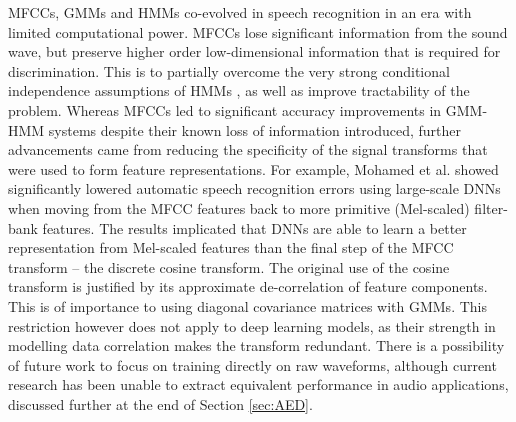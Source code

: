 \documentclass[12pt]{llncs}
\begin{document}
 MFCCs, GMMs and HMMs co-evolved in speech recognition in an era with limited computational power. MFCCs lose significant information from the sound wave, but preserve higher order low-dimensional information that is required for discrimination. This is to partially overcome the very strong conditional independence assumptions of HMMs \cite{mohamed2012acoustic}, as well as improve tractability of the problem.
Whereas MFCCs led to significant accuracy improvements in GMM-HMM systems despite their known loss of information introduced, further advancements came from reducing the specificity of the signal transforms that were used to form feature representations.
For example, Mohamed et al. \cite{mohamed2012acoustic} showed significantly lowered automatic speech recognition errors using large-scale DNNs when moving from the MFCC features back to more primitive (Mel-scaled) filter-bank features. The results implicated that DNNs are able to learn a better representation from Mel-scaled features than the final step of the MFCC transform -- the discrete cosine transform. The original use of the cosine transform is justified by its approximate de-correlation of feature components. This is of importance to using diagonal covariance matrices with GMMs. This restriction however does not apply to deep learning models, as their strength in modelling data correlation makes the transform redundant. There is a possibility of future work to focus on training directly on raw waveforms, although current research has been unable to extract equivalent performance in audio applications, discussed further at the end of Section \ref{sec:AED}.


\end{document}
